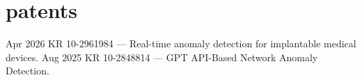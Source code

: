 \documentclass[]{twentysecondcv}
\begin{document}
\section{patents}
\begin{twentyshort}
  \twentyitemshort
    {Apr 2026}
    {KR 10-2961984 --- Real-time anomaly detection for implantable medical devices.}
  \twentyitemshort
    {Aug 2025}
    {KR 10-2848814 --- GPT API-Based Network Anomaly Detection.}
\end{twentyshort}
\end{document}
